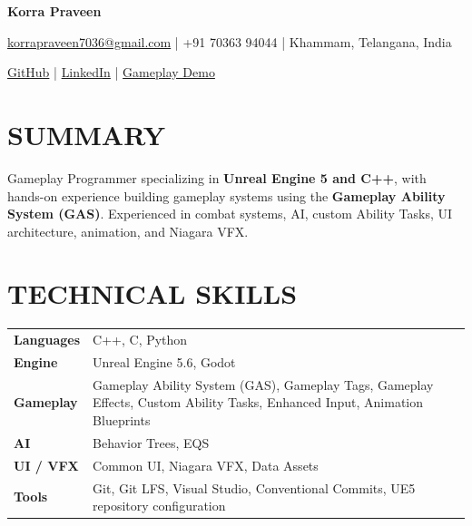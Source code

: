 \documentclass[10pt,letterpaper]{article}
\begin{document}

\begin{center}

    {\LARGE \textbf{Korra Praveen}}

    \vspace{3pt}

    \small
    \href{mailto:korrapraveen7036@gmail.com}
    {korrapraveen7036@gmail.com}
    \;|\;
    +91 70363 94044
    \;|\;
    Khammam, Telangana, India

    \vspace{3pt}
\small
\href{https://github.com/Praveen703639/Advanced-RPG}{GitHub}
\;|\;
\href{https://www.linkedin.com/in/korra-praveen}{LinkedIn}
\;|\;
\href{https://www.youtube.com/watch?v=sfk2eV6xraI}{Gameplay Demo}

\end{center}


\section{SUMMARY}

Gameplay Programmer specializing in \textbf{Unreal Engine 5 and C++}, with
hands-on experience building gameplay systems using the
\textbf{Gameplay Ability System (GAS)}. Experienced in combat systems,
AI, custom Ability Tasks, UI architecture, animation, and Niagara VFX.


\section{TECHNICAL SKILLS}

\begin{tabularx}{\linewidth}{@{}>{\bfseries}p{1.05in} X@{}}

Languages
&
C++, C, Python
\\[2.5pt]

Engine
&
Unreal Engine 5.6, Godot
\\[2.5pt]

Gameplay
&
Gameplay Ability System (GAS), Gameplay Tags, Gameplay Effects,
Custom Ability Tasks, Enhanced Input, Animation Blueprints
\\[2.5pt]

AI
&
Behavior Trees, EQS
\\[2.5pt]

UI / VFX
&
Common UI, Niagara VFX, Data Assets
\\[2.5pt]

Tools
&
Git, Git LFS, Visual Studio, Conventional Commits,
UE5 repository configuration

\end{tabularx}
\end{document}
